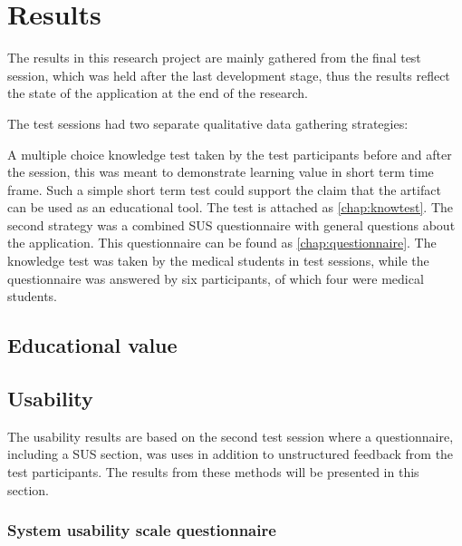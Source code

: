 


\chapter{Results}\label{chap:results}




The results in this research project are mainly gathered from the final test session, which was held after the last development stage, thus the results reflect the state of the application at the end of the research. 

The test sessions had two separate qualitative data gathering strategies: 

A multiple choice knowledge test taken by the test participants before and after the session,  this was meant to demonstrate learning value in short term time frame. Such a simple short term test could support the claim that the artifact can be used as an educational tool. The test is attached as \autoref{chap:knowtest}.
The second strategy was a combined SUS questionnaire with general questions about the application. This questionnaire can be found as \autoref{chap:questionnaire}.
The knowledge test was taken by the medical students in test sessions, while the questionnaire was answered by six participants, of which four were medical students.


\section{Educational value}





\section{Usability}

The usability results are based on the second test session where a questionnaire, including a SUS section, was uses in addition to unstructured feedback from the test participants. The results from these methods will be presented in this section. 

\subsection{System usability scale questionnaire}
 
